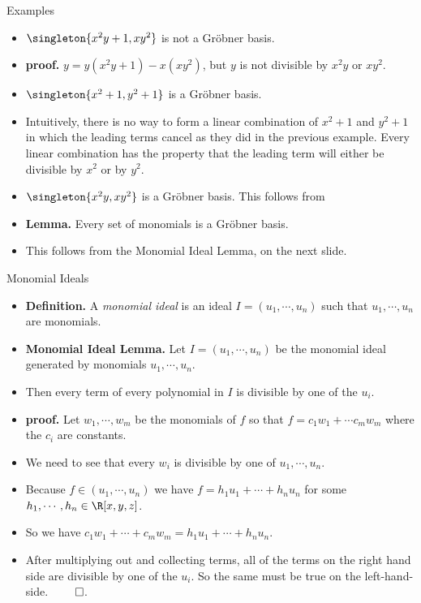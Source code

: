 \documentclass[handout]{beamer}
\begin{document}

\begin{frame}{Examples}

\begin{itemize}
  \item $\singleton{x^2y+1, xy^2}$ is not a Gr\"{o}bner basis.
  \item \textbf{proof.} $y = y(x^2y+1) -x(xy^2)$, but $y$ is not divisible by $x^2y$ or $xy^2$.
  \item $\singleton{x^2 + 1, y^2 + 1}$ is a Gr\"{o}bner basis.
  \item Intuitively, there is no way to form a linear combination of $x^2 + 1$ and $y^2 + 1$
  in which the leading terms cancel as they did in the previous example. Every linear combination has the property that the leading term will either be divisible by $x^2$ or by $y^2$.
  \item $\singleton{x^2y, xy^2}$ is a Gr\"{o}bner basis. This follows from
  \item \textbf{Lemma.} Every set of monomials is a Gr\"{o}bner basis.
  \item This follows from the Monomial Ideal Lemma, on the next slide.
\end{itemize}

\end{frame}

\begin{frame}{Monomial Ideals}

\begin{itemize}
  \item \textbf{Definition.} A \emph{monomial ideal} is an ideal $I=(u_1,\cdots, u_n)$ such that $u_1,\cdots,u_n$ are monomials.
  \item \textbf{Monomial Ideal Lemma.} Let $I=(u_1,\cdots, u_n)$ be the monomial ideal generated by monomials $u_1,\cdots,u_n$.
  \item Then every term of every polynomial in $I$ is divisible by one of the $u_i$.
  \item \textbf{proof.}  Let $w_1,\cdots,w_m$ be the monomials of $f$ so that $f=c_1w_1 + \cdots c_m w_m$ where the $c_i$ are constants.
  \item We need to see that every $w_i$ is divisible by one of $u_1,\cdots,u_n$.
  \item Because $f\in (u_1,\cdots, u_n)$ we have $f=h_1u_1 + \cdots + h_n u_n$ for some $h_1,\cdots,h_n\in\R[x,y,z]$.
  \item So we have $c_1w_1 + \cdots + c_m w_m = h_1u_1 + \cdots + h_n u_n$.
  \item After multiplying out and collecting terms, all of the terms on the right hand side are divisible by one of the $u_i$.
  So the same must be true on the left-hand-side. $\qed$.
\end{itemize}

\end{frame}
\end{document}
